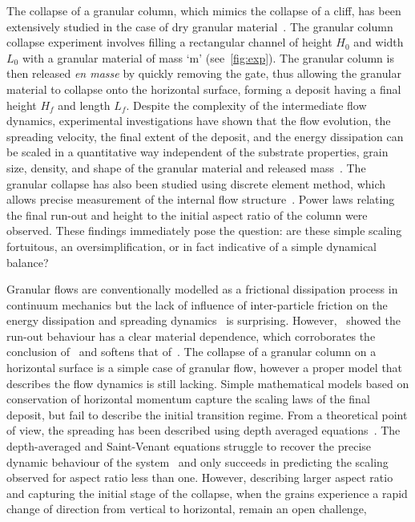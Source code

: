 The collapse of a granular column, which mimics the
collapse of a cliff, has been extensively studied in the case of
dry granular 
material~\citep{Lube2005,Lajeunesse2004,Kerswell2005,Zenit2005,Staron2007a,Hogg2007,Lo2009}.
The granular column collapse experiment involves filling a rectangular channel 
of height $H_0$ and width $L_0$ with a granular material of mass 
`m' (see~\cref{fig:exp}). The granular column is then released \textit{en 
masse} by quickly removing the gate, thus allowing the granular material to 
collapse onto the horizontal surface, forming a deposit having a final height 
$H_f$ and length $L_f$. Despite the complexity of the intermediate flow 
dynamics, experimental investigations have shown that the flow evolution, the 
spreading velocity, the final extent of the deposit, and the energy dissipation 
can be scaled in a quantitative way independent of the substrate properties, 
grain size, density, and shape of the granular material and released 
mass~\citep{Staron2007a,Lajeunesse2005,Lube2005}. The granular collapse has 
also been studied using discrete element method, which allows precise 
measurement of the internal flow 
structure~\citep{Lo2009,Staron2006a,Staron2007a,Utili2014}.
Power laws relating the final run-out and height to the initial aspect ratio of 
the column were observed. These findings immediately pose the question: are 
these simple scaling fortuitous, an oversimplification, or in fact indicative 
of a simple dynamical balance? 


Granular flows are conventionally modelled as a frictional dissipation process 
in continuum mechanics but the lack of influence of inter-particle friction on 
the energy dissipation and spreading dynamics~\citep{Lube2005} is surprising. 
However,~\citet{Kerswell2005} showed the run-out behaviour has a clear material 
dependence, which corroborates the conclusion of~\citet{Lajeunesse2004} and 
softens that of~\citet{Lube2005}. The collapse of a granular column on a 
horizontal surface is a simple case of granular flow, however a proper model 
that describes the flow dynamics is still lacking. Simple mathematical models 
based on conservation of horizontal momentum capture the scaling laws of the 
final deposit, but fail to describe the initial transition regime. From a 
theoretical point of view, the spreading has been described using depth 
averaged equations~\citep{Kerswell2005,Larrieu2006}. The depth-averaged and 
Saint-Venant equations struggle to recover the precise dynamic behaviour of the 
system~\citep{Warnett2013} and only succeeds in predicting the scaling observed 
for aspect ratio less than one. However, describing larger aspect ratio and 
capturing the initial stage of the collapse, when the grains experience a rapid 
change of direction from vertical to horizontal, remain an open challenge, 


